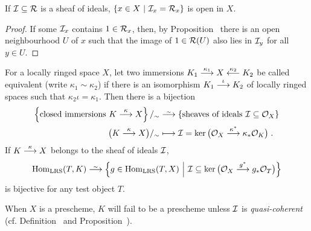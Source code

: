 \documentclass[a4paper,parskip=half,numbers=enddot, DIV=12]{scrreprt}
\begin{document}
\begin{cor}
    If $\mathcal{I}\subseteq \mathcal{R}$ is a sheaf of ideals, $\left\{x\in X\ \middle|\  \mathcal{I}_x=\mathcal{R}_x\right\}$ is open in $X$.
\end{cor}
\begin{proof}
	If some $\mathcal{I}_x$ contains $1\in \mathcal{R}_x$, then, by Proposition~ there is an open neighbourhood $U$ of $x$ such that the image of $1\in\mathcal{R}(U)$ also lies in $\mathcal{I}_y$ for all $y\in U$.
\end{proof}
\begin{prop}
    For a locally ringed space $X$, let two immersions $K_1\morphism[\kappa_1] X\lmorphism[\kappa_2] K_2$ be called equivalent (write $\kappa_1\sim\kappa_2$) if there is an isomorphism $K_1\morphism[\iota] K_2$ of locally ringed spaces such that $\kappa_2\iota = \kappa_1$. Then there is a bijection 
    \begin{align*}
	    \left\{\text{closed immersions }K\morphism[\kappa]X\right\}/_\sim&\isomorphism\left\{\text{sheaves of ideals }\Ii\subseteq \Oo_X\right\}\\
        \big(K\morphism[\kappa]X\big)/_\sim &\longmapsto \Ii = \ker\big(\Oo_X\morphism[\kappa^*]\kappa_* \Oo_K\big)\;.
    \end{align*}
    If $K\morphism[\kappa] X$ belongs to the sheaf of ideals $\mathcal{I}$,
    \begin{align*}
        \Hom_{\cat{LRS}}(T,K) \isomorphism\left\{ g\in \Hom_{\cat{LRS}}(T,X) \st \Ii\subseteq \ker\big(\Oo_X \morphism[g^*]g_*\Oo_T\big)\right\}
    \end{align*}
    is bijective for any test object $T$.
\end{prop}
\begin{rem*}
    When $X$ is a prescheme, $K$ will fail to be a prescheme unless $\mathcal{I}$ is \emph{quasi-coherent} (cf. Definition~ and Proposition~).
\end{rem*}
\end{document}
